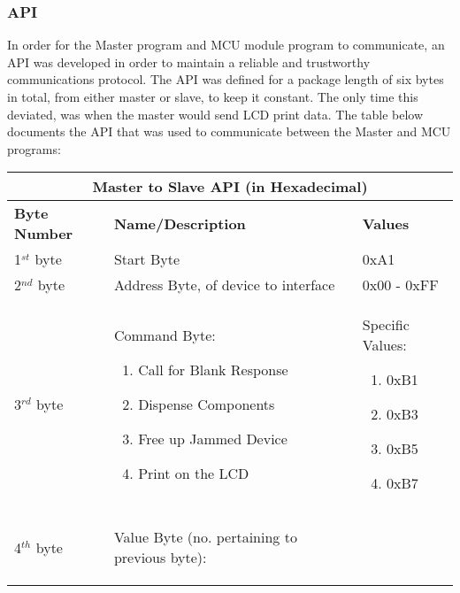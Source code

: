 \documentclass[a4paper,11pt]{article}
\numberwithin{figure}{section}
\numberwithin{table}{section}
\begin{document}
\subsubsection{API}
\label{subsubsec:API}
In order for the Master program and MCU module program to communicate, an API was developed in order to maintain a reliable and trustworthy communications protocol. The API was defined for a package length of six bytes in total, from either master or slave, to keep it constant. The only time this deviated, was when the master would send LCD print data. The table below documents the API that was used to communicate between the Master and MCU programs:
	\begin{center}
		\begin{table}[ht]
			\centering
			\begin{tabular}{| m{3cm} | m{5cm}| m{5cm} |}
			\hline
			\multicolumn{3}{|c|}{\bfseries Master to Slave API (in Hexadecimal)}\\
			\hline
			\bfseries{Byte Number}  & \bfseries{Name/Description} & \bfseries{Values} \\
			\hline
			1$^{st}$ byte & Start Byte & 0xA1\\
			\hline
			2$^{nd}$ byte & Address Byte, of device to interface & 0x00 - 0xFF \\
			\hline
			3$^{rd}$ byte & Command Byte: {\begin{enumerate}[noitemsep,topsep=0pt,parsep=0pt]			  
											\item Call for Blank Response
											\item Dispense Components
											\item Free up Jammed Device
											\item Print on the LCD
										\end{enumerate}}	& Specific Values: \begin{enumerate}[noitemsep,topsep=0pt,parsep=0pt] 
																			\item 0xB1
																			\item 0xB3
																			\item 0xB5
																			\item 0xB7
																			\end{enumerate} \\
			\hline
			4$^{th}$ byte & Value Byte (no. pertaining to previous byte): \begin{enumerate}[nosep]
																				\setlength{\itemsep}{0pt}
   																				\setlength{\parskip}{0pt}

\end{enumerate}
\end{tabular}
\end{table}
\end{center}
\end{document}
